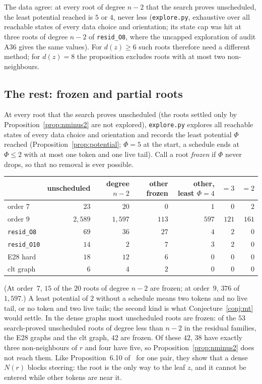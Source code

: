 \documentclass[11pt]{amsart}
\theoremstyle{definition}
\begin{document}
The data agree: at every root of degree $n-2$ that the search proves unscheduled, the least
potential reached is $5$ or $4$, never less (\texttt{explore.py}, exhaustive over all reachable states
of every data choice and orientation; its state cap was hit at three roots of degree $n-2$ of
\texttt{resid\_O8}, where the uncapped exploration of audit A36 gives the same values). For $d(z)\ge6$ such roots therefore need a different method; for $d(z)=8$ the
proposition excludes roots with at most two non-neighbours.

\subsection*{The rest: frozen and partial roots} At every root that the search proves unscheduled
(the roots settled only by Proposition~\ref{prop:nminus2} are not explored), \texttt{explore.py}
explores all reachable states of every data choice and orientation and records the least potential
$\Phi$ reached (Proposition~\ref{prop:potential}; $\Phi=5$ at the start, a schedule ends at
$\Phi\le2$ with at most one token and one live tail). Call a root \emph{frozen} if $\Phi$ never drops,
so that no removal is ever possible.
\begin{center}\small
\begin{tabular}{@{}lrrrrrr@{}}
\toprule
 & unscheduled & degree $n-2$ & other frozen & other, least $\Phi=4$ & $=3$ & $=2$\\
\midrule
order $7$ & $23$ & $20$ & $0$ & $1$ & $0$ & $2$\\
order $9$ & $2{,}589$ & $1{,}597$ & $113$ & $597$ & $121$ & $161$\\
\texttt{resid\_O8} & $69$ & $36$ & $27$ & $4$ & $2$ & $0$\\
\texttt{resid\_O10} & $14$ & $2$ & $7$ & $3$ & $2$ & $0$\\
E28 hard & $18$ & $12$ & $6$ & $0$ & $0$ & $0$\\
clt graph & $6$ & $4$ & $2$ & $0$ & $0$ & $0$\\
\bottomrule
\end{tabular}
\end{center}
(At order~$7$, $15$ of the $20$ roots of degree $n-2$ are frozen; at order~$9$, $376$ of $1{,}597$.)
A least potential of $2$ without a schedule means two tokens and no live tail, or no token and two
live tails; the second kind is what Conjecture~\ref{conj:mt} would settle. In the dense graphs most
unscheduled roots are frozen: of the $53$ search-proved unscheduled roots of degree less than $n-2$ in
the residual families, the E28 graphs and the clt graph, $42$ are frozen. Of these $42$, $38$ have
exactly three non-neighbours of $r$ and four have five, so Proposition~\ref{prop:nminus2} does not
reach them. Like Proposition~6.10 of~\cite{TRN} for one pair, they show that a
dense $N(r)$ blocks steering: the root is the only way to the leaf $z$, and it cannot be entered while
other tokens are near it.
\end{document}
